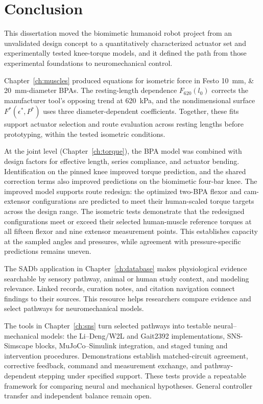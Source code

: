 \chapter{Conclusion}\label{ch:conclusion}
\graphicspath{{../Figures/80-conclusion/}{figs/80-conclusion/}}

This dissertation moved the biomimetic humanoid robot project from an unvalidated design concept to a quantitatively characterized actuator set and experimentally tested knee-torque models, and it defined the path from those experimental foundations to neuromechanical control.

Chapter~\ref{ch:muscles} produced equations for isometric force in Festo \qtylist{10;20}{\mm}-diameter BPAs. The resting-length dependence $F_{620}(l_0)$ corrects the manufacturer tool's opposing trend at \qty{620}{\kPa}, and the nondimensional surface $F^*(\epsilon^*,P^*)$ uses three diameter-dependent coefficients. Together, these fits support actuator selection and route evaluation across resting lengths before prototyping, within the tested isometric conditions.

At the joint level (Chapter~\ref{ch:torque}), the BPA model was combined with design factors for effective length, series compliance, and actuator bending. Identification on the pinned knee improved torque prediction, and the shared correction terms also improved predictions on the biomimetic four-bar knee. The improved model supports route redesign: the optimized two-BPA flexor and cam-extensor configurations are predicted to meet their human-scaled torque targets across the design range. The isometric tests demonstrate that the redesigned configurations meet or exceed their selected human-muscle reference torques at all fifteen flexor and nine extensor measurement points. This establishes capacity at the sampled angles and pressures, while agreement with pressure-specific predictions remains uneven.

The SADb application in Chapter~\ref{ch:database} makes physiological evidence searchable by sensory pathway, animal or human study context, and modeling relevance. Linked records, curation notes, and citation navigation connect findings to their sources. This resource helps researchers compare evidence and select pathways for neuromechanical models.

The tools in Chapter~\ref{ch:sns} turn selected pathways into testable neural--mechanical models: the Li--Deng/W2L and Gait2392 implementations, SNS-Simscape blocks, MuJoCo--Simulink integration, and staged tuning and intervention procedures. Demonstrations establish matched-circuit agreement, corrective feedback, command and measurement exchange, and pathway-dependent stepping under specified support. These tests provide a repeatable framework for comparing neural and mechanical hypotheses. General controller transfer and independent balance remain open.


